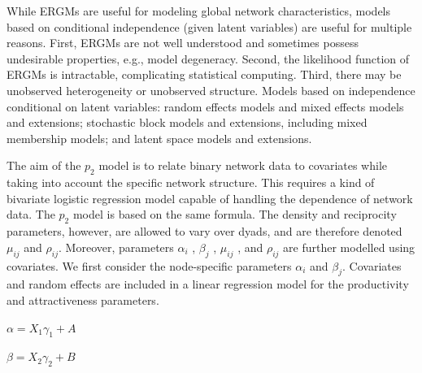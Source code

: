 \documentclass[12pt]{ociamthesis}  %
\begin{document}
	While ERGMs are useful for modeling global network characteristics, models based on conditional independence (given latent variables) are useful for multiple reasons. First, ERGMs are not well understood and sometimes possess undesirable properties, e.g., model degeneracy. Second, the likelihood function of ERGMs is intractable, complicating statistical computing. Third, there may be unobserved heterogeneity or unobserved structure.
	Models based on independence conditional on latent variables: random effects models and mixed effects models and extensions; stochastic block models and extensions, including mixed membership models; and latent space models and extensions.
	
	The aim of the $p_{2}$ model is to relate binary network data to covariates while taking into account the specific network structure. This requires a kind of bivariate logistic regression model capable of handling the dependence of network data.
	The $p_{2}$ model is based on the same formula. The density and reciprocity parameters, however, are allowed to vary over dyads, and are therefore denoted $μ_{ij} $ and $\rho_{ij}$. Moreover, parameters $\alpha_{i}$ , $\beta_{j}$ , $\mu_{ij}$ , and $\rho_{ij}$ are further modelled using covariates.
	We first consider the node-specific parameters $\alpha_{i}$ and $\beta_{j}$. Covariates and random effects are included in a linear regression model for the productivity and attractiveness parameters.
	
	$\alpha = X_{1} \gamma_{1} + A$
	
	$\beta = X_{2} \gamma_{2} + B$
	
\end{document}
